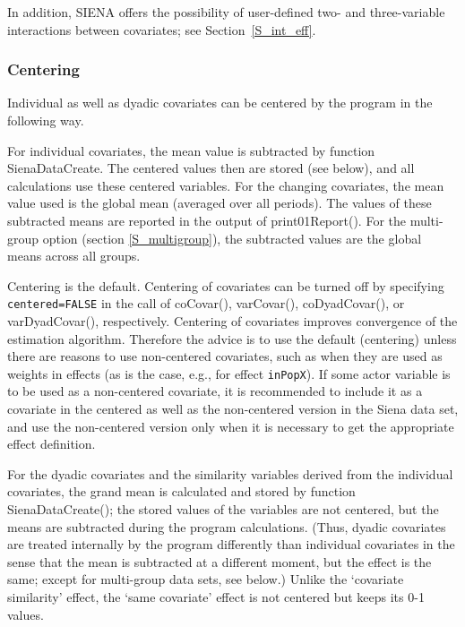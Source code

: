 \documentclass[a4paper,fleqn,11pt]{article}
\newcommand{\+}{\, + \,}
\newcommand{\sfn}[1]{\textsf{#1}}
\newcommand{\SI}{{\sf SIENA }}
\begin{document}
In addition, \SI offers the possibility of user-defined two- and three-variable
interactions between covariates; see Section~\ref{S_int_eff}.


\subsubsection{Centering}
\label{S_center}

Individual as well as dyadic covariates can be centered
by the program in the following way.

For individual covariates, the mean value is subtracted
by function \sfn{SienaDataCreate}. The centered values then are stored
(see below),
and all calculations use these centered variables.
For the changing covariates, the mean
value used is the global mean (averaged over all periods).
The values of these subtracted means are reported in the output
of \sfn{print01Report()}.
For the multi-group option (section \ref{S_multigroup}),
the subtracted values are the global means across all groups.

Centering is the default.
Centering of covariates can be turned off by specifying
\texttt{centered=FALSE} in the call of \sfn{coCovar()},
\sfn{varCovar()}, \sfn{coDyadCovar()}, or \sfn{varDyadCovar()}, respectively.
Centering of covariates improves
convergence of the estimation algorithm.
Therefore the advice is to use the default (centering) unless there are reasons to
use non-centered covariates, such as when they are used as weights in effects
(as is the case, e.g., for effect \texttt{inPopX}).
If some actor variable is to be used as a non-centered covariate,
it is recommended to include it as a covariate in the centered
as well as the non-centered version in the Siena data set,
and use the non-centered version only when it is necessary
to get the appropriate effect definition.

For the dyadic covariates and the similarity variables derived
from the individual covariates, the grand mean is calculated
and stored by function \sfn{SienaDataCreate()};
the stored values of the variables are not centered, but the means
are subtracted during the program calculations. (Thus,
dyadic covariates are treated internally by the program differently than
individual covariates in the sense that the mean is subtracted at
a different moment, but the effect is the same; except for multi-group
data sets, see below.)
Unlike the `covariate similarity' effect,
the `same covariate' effect is not centered but keeps its 0-1 values.
\end{document}
